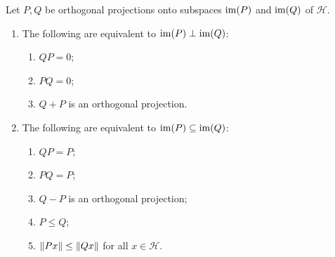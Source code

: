 \begin{proposition} \label{perpendicularProjections} \label{subspaceProjections}
Let $P,Q$ be orthogonal projections onto subspaces $\operatorname{im}(P)$ and $\operatorname{im}(Q)$ of $\mathcal{H}$.
\begin{enumerate}
\item The following are equivalent to $\operatorname{im}(P) \perp \operatorname{im}(Q)$:
\begin{enumerate}
\item $QP = 0$;
\item $PQ = 0$;
\item $Q+P$ is an orthogonal projection.
\end{enumerate}
\item The following are equivalent to $\operatorname{im}(P) \subseteq \operatorname{im}(Q)$:
\begin{enumerate}
\item $QP = P$;
\item $PQ = P$;
\item $Q-P$ is an orthogonal projection;
\item $P\leq Q$;
\item $\lVert Px\rVert \leq \lVert Qx\rVert$ for all $x \in \mathcal{H}$.
\end{enumerate}
\end{enumerate}
\end{proposition}
